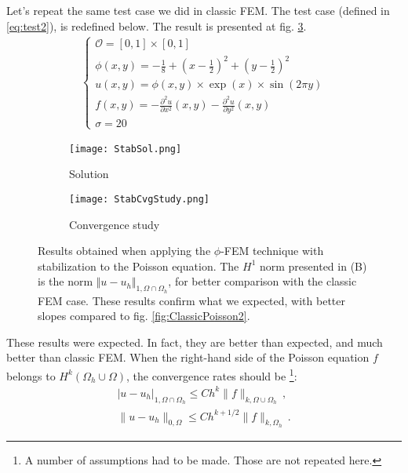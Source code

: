 Let's repeat the same test case we did in classic FEM. The test case (defined in \eqref{eq:test2}), is redefined below. The result is presented at fig. \ref{fig:StabPoisson}.
\begin{align}
    \begin{cases}
    \mathcal{O} = [0,1]\times[0,1] \\
    \phi(x,y) = -\frac{1}{8} + \left( x-\frac{1}{2} \right)^2 + \left( y-\frac{1}{2} \right)^2 \\
    u(x,y)=\phi(x,y) \times \exp(x) \times \sin(2\pi y) \\
    f(x,y) = -\frac{\partial^2 u}{\partial x^2}(x,y) -\frac{\partial^2 u}{\partial y^2}(x,y) \\
    \sigma = 20
    \end{cases}
    \label{eq:test1redef}
\end{align}

\begin{figure}[H]
    \centering
    \begin{subfigure}[b]{0.45\textwidth}
        \texttt{[image: StabSol.png]}
        \caption{Solution}
        \label{fig:StabSol}
    \end{subfigure}
    \begin{subfigure}[b]{0.45\textwidth}
        \texttt{[image: StabCvgStudy.png]}
        \caption{Convergence study}
        \label{fig:StabCvgStudy}
    \end{subfigure}
       \caption{Results obtained when applying the $\phi$-FEM technique with stabilization to the Poisson equation. The $H^1$ norm presented in (B) is the norm $\Vert u - u_h\Vert_{1, \Omega\cap\Omega_h}$, for better comparison with the classic FEM case. These results confirm what we expected, with better slopes compared to fig. \ref{fig:ClassicPoisson2}.}
       \label{fig:StabPoisson}
\end{figure}
These results were expected. In fact, they are better than expected, and much better than classic FEM. When the right-hand side of the Poisson equation $f$ belongs to $H^k(\Omega_h\cup\Omega)$, the convergence rates should be \parencite[p.4]{Reference3}\footnote{A number of assumptions had to be made. Those are not repeated here.}:  
\begin{align}
    | u - u_h|_{1, \Omega\cap\Omega_h} \le Ch^k \|f \|_{k, \Omega\cup\Omega_h}  \,,\\
    \| u - u_h\|_{0, \Omega} \le Ch^{k+1/2} \|f \|_{k, \Omega_h} \,.
\end{align}	

